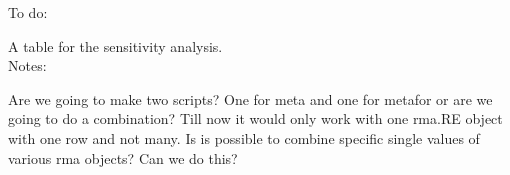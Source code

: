 \documentclass[11pt, a4paper]{article} %
\begin{document}
\begin{table}[ht]
\centering
\caption{Results of the meta-analysis.ES = Effect Size, Q = Test for residual heterogeneity, $I^2$ = residual heterogeneity, Egger's test and the fails-safe number for publication bias testing.} 
{\footnotesize
{}
}
\end{table}

\bigskip



\begin{table}[ht]
\centering
\caption{Results of the meta-regression (mixed-effects model). The model results are shown taking a moderator into account and displaying the coefficients. Results for the whole model are displayed as Q = Test for residual heterogeneity, $I^2$ = residual heterogeneity and QM = Test of Moderators.} 
{\footnotesize
{}
}
\end{table}




To do:

A table for the sensitivity analysis. \\

Notes:

Are we going to make two scripts? One for meta and one for metafor or are we going to do a combination? 
Till now it would only work with one rma.RE object with one row and not many. Is is possible to combine specific single values of various rma objects? Can we do this?
\end{document}
